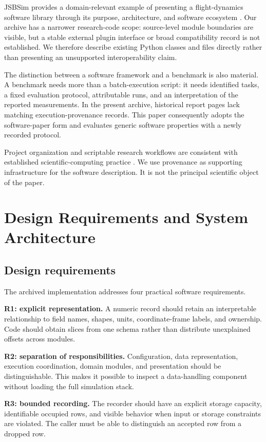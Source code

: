 \documentclass[11pt,a4paper]{article}
\begin{document}
JSBSim provides a domain-relevant example of presenting a flight-dynamics software library through its purpose, architecture, and software ecosystem \citep{berndt2026}. Our archive has a narrower research-code scope: source-level module boundaries are visible, but a stable external plugin interface or broad compatibility record is not established. We therefore describe existing Python classes and files directly rather than presenting an unsupported interoperability claim.

The distinction between a software framework and a benchmark is also material. A benchmark needs more than a batch-execution script: it needs identified tasks, a fixed evaluation protocol, attributable runs, and an interpretation of the reported measurements. In the present archive, historical report pages lack matching execution-provenance records. This paper consequently adopts the software-paper form and evaluates generic software properties with a newly recorded protocol.

Project organization and scriptable research workflows are consistent with established scientific-computing practice \citep{wilson2017,sandve2013}. We use provenance as supporting infrastructure for the software description. It is not the principal scientific object of the paper.

\section{Design Requirements and System Architecture}
\label{sec:architecture}
\subsection{Design requirements}
The archived implementation addresses four practical software requirements.

\textbf{R1: explicit representation.} A numeric record should retain an interpretable relationship to field names, shapes, units, coordinate-frame labels, and ownership. Code should obtain slices from one schema rather than distribute unexplained offsets across modules.

\textbf{R2: separation of responsibilities.} Configuration, data representation, execution coordination, domain modules, and presentation should be distinguishable. This makes it possible to inspect a data-handling component without loading the full simulation stack.

\textbf{R3: bounded recording.} The recorder should have an explicit storage capacity, identifiable occupied rows, and visible behavior when input or storage constraints are violated. The caller must be able to distinguish an accepted row from a dropped row.
\end{document}
